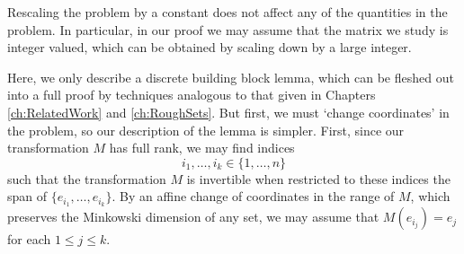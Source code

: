 \begin{remark}
    Rescaling the problem by a constant does not affect any of the quantities in the problem. In particular, in our proof we may assume that the matrix we study is integer valued, which can be obtained by scaling down by a large integer.
\end{remark}

Here, we only describe a discrete building block lemma, which can be fleshed out into a full proof by techniques analogous to that given in Chapters \ref{ch:RelatedWork} and \ref{ch:RoughSets}. But first, we must `change coordinates' in the problem, so our description of the lemma is simpler. First, since our transformation $M$ has full rank, we may find indices
%
\[ i_1, \dots, i_k \in \{ 1, \dots, n \} \]
%
such that the transformation $M$ is invertible when restricted to these indices the span of $\{ e_{i_1}, \dots, e_{i_k} \}$. By an affine change of coordinates in the range of $M$, which preserves the Minkowski dimension of any set, we may assume that $M(e_{i_j}) = e_j$ for each $1 \leq j \leq k$.

